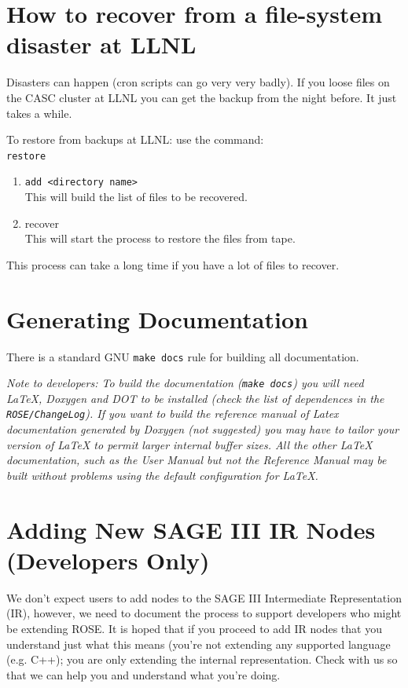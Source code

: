 \section{How to recover from a file-system disaster at LLNL}%
   Disasters can happen (cron scripts can go very very badly).  If you 
loose files on the CASC cluster at LLNL you can get the backup from the 
night before.  It just takes a while.

   To restore from backups at LLNL: use the command: \\
{\tt restore}
\begin{enumerate}
   \item {\tt add <directory name>} \\
       This will build the list of files to be recovered.
   \item recover \\
       This will start the process to restore the files from tape.
\end{enumerate}
   This process can take a long time if you have a lot of files to recover.

\section{Generating Documentation}%
   There is a standard GNU {\tt make docs} rule for building all documentation.

{\it Note to developers: To build the documentation ({\tt make docs}) you will need 
LaTeX, Doxygen and DOT to be installed (check the list of dependences in the 
{\tt ROSE/ChangeLog}). If you want to build the reference manual of Latex documentation
generated by Doxygen (not suggested) you may have to tailor your version of LaTeX to 
permit larger internal buffer sizes.  All the other LaTeX documentation, such as the
User Manual but not the Reference Manual may be built without problems using the 
default configuration for LaTeX.
}

\section {Adding New SAGE III IR Nodes (Developers Only)}%
    We don't expect users to add nodes to the SAGE III Intermediate Representation (IR),
however, we need to document the process to support developers who might be extending
ROSE.  It is hoped that if you proceed to add IR nodes that you understand just
what this means (you're not extending any supported language (e.g. C++); you are only
extending the internal representation. Check with us so that we can help you and
understand what you're doing.

